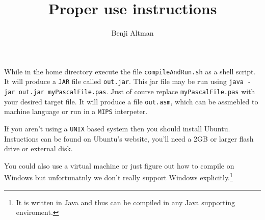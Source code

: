 \documentclass{article}
\title{Proper use instructions}
\author{Benji Altman}
\begin{document}
\maketitle
While in the home directory execute the file \texttt{compileAndRun.sh} as a shell script. It will produce a \texttt{JAR} file called \texttt{out.jar}. This jar file may be run using \texttt{java -jar out.jar myPascalFile.pas}. Just of course replace \texttt{myPascalFile.pas} with your desired target file. It will produce a file \texttt{out.asm}, which can be assmebled to machine language or run in a \texttt{MIPS} interpeter.

If you aren't using a \texttt{UNIX} based system then you should install Ubuntu. Instuctions can be found on Ubuntu's website, you'll need a 2GB or larger flash drive or external disk.

You could also use a virtual machine or just figure out how to compile on Windows but unfortunatnly we don't really support Windows explicitly.\footnote{It is written in Java and thus can be compiled in any Java supporting enviroment.}
\end{document}
